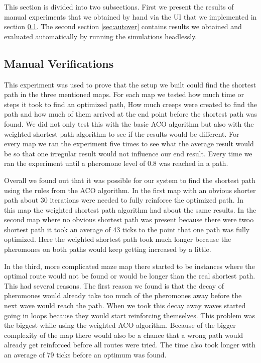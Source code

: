 This section is divided into two subsections. First we present the results of manual experiments that we obtained by hand via the UI that we implemented in section \ref{sec:manualver}.
The second section \ref{sec:autover} contains results we obtained and evaluated automatically by running the simulations headlessly.

\subsection{Manual Verifications}
\label{sec:manualver}
This experiment was used to prove that the setup we built could find the shortest path in the three mentioned maps. For each map we tested how much time or steps it took to find an optimized path, How much creeps were created to find the path and how much of them arrived at the end point before the shortest path was found. We did not only test this with the basic ACO algorithm but also with the weighted shortest path algorithm to see if the results would be different. For every map we ran the experiment five times to see what the average result would be so that one irregular result would not influence our end result. Every time we ran the experiment until a pheromone level of 0.8 was reached in a path. 

Overall we found out that it was possible for our system to find the shortest path using the rules from the ACO algorithm. In the first map with an obvious shorter path about 30 iterations were needed to fully reinforce the optimized path. In this map the weighted shortest path algorithm had about the same results. In the second map where no obvious shortest path was present because there were twoo shortest path it took an average of 43 ticks to the point that one path was fully optimized. Here the weighted shortest path took much longer because the pheromones on both paths would keep getting increased by a little.  

In the third, more complicated maze map there started to be instances where the optimal route would not be found or would be longer than the real shortest path. This had several reasons. The first reason we found is that the decay of pheromones would already take too much of the pheromones away before the next wave would reach the path. When we took this decay away waves started going in loops because they would start reinforcing themselves. This problem was the biggest while using the weighted ACO algorithm. Because of the bigger complexity of the map there would also be a chance that a wrong path would already get reinforced before all routes were tried. The time also took longer with an average of 79 ticks before an optimum was found. 

